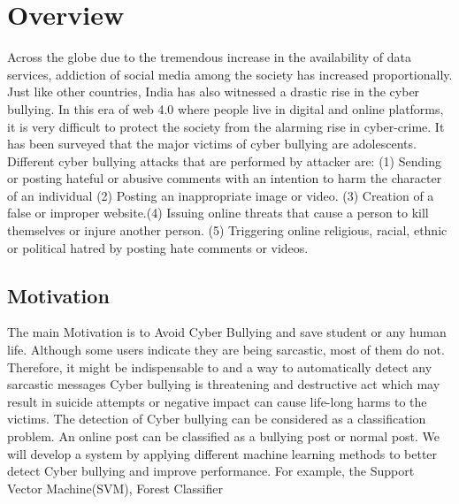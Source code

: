 \documentclass[oneside,a4paper,12pt]{report}
\begin{document}
\section {Overview}
\item Across the globe due to the tremendous increase in the
availability of data services, addiction of social media among
the society has increased proportionally. Just like other
countries, India has also witnessed a drastic rise in the cyber
bullying. In this era of web 4.0 where people live in digital
and online platforms, it is very difficult to protect the society
from the alarming rise in cyber-crime. It has been surveyed
that the major victims of cyber bullying are adolescents.
Different cyber bullying attacks that are performed by
attacker are: (1) Sending or posting hateful or abusive
comments with an intention to harm the character of an
individual (2) Posting an inappropriate image or video. (3)
Creation of a false or improper website.(4) Issuing online
threats that cause a person to kill themselves or injure another
person. (5) Triggering online religious, racial, ethnic or
political hatred by posting hate comments or videos.
 \\

\subsection{Motivation}
\label{sec:problem}
\item The main Motivation is to Avoid Cyber Bullying and save student or any human life.
Although some users indicate they are being sarcastic, most of them do not. Therefore, it might be indispensable to and a way to automatically detect any sarcastic messages 
Cyber bullying is threatening and destructive act which may result in suicide attempts or negative impact can cause life-long harms to the victims.
The detection of Cyber bullying can be considered as a classification problem. An online post can be classified as a bullying post or normal post.
We will develop a system by applying different machine learning methods to better detect Cyber bullying and improve performance. For example, the Support Vector Machine(SVM), Forest Classifier \\
\end{document}
